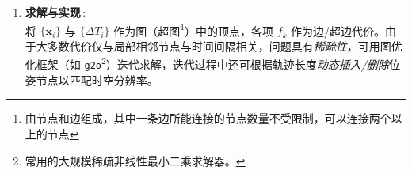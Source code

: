 \documentclass[../main.tex]{subfiles}
\begin{document}
\begin{enumerate}
\begin{itemize}
{\begin{enumerate}
\begin{itemize}
\begin{enumerate}
\begin{figure}[H]
\begin{minipage}[t]{0.35\textwidth}
        \caption{非完整运动学约束}
    \end{minipage}
\end{figure}
\end{enumerate}
  \end{itemize}

  \item \textbf{求解与实现}\,:\\
  将 $\{\mathbf{x}_i\}$ 与 $\{\Delta T_i\}$ 作为图（超图\footnote{由节点和边组成，其中一条边所能连接的节点数量不受限制，可以连接两个以上的节点}）中的顶点，各项 $f_k$ 作为边/超边代价。由于大多数代价仅与局部相邻节点与时间间隔相关，问题具有\emph{稀疏性}，可用图优化框架（如 \texttt{g2o}\footnote{常用的大规模稀疏非线性最小二乘求解器。}）迭代求解，迭代过程中还可根据轨迹长度\emph{动态插入/删除}位姿节点以匹配时空分辨率。
\end{enumerate}
}
        \end{itemize}
\end{enumerate}
\end{document}
